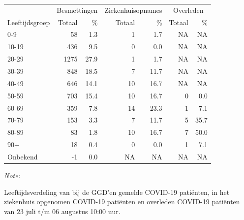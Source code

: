\documentclass[
  english,
  man,floatsintext]{apa6}
\begin{document}
\begin{table}[H]
\centering\begingroup\fontsize{11}{13}\selectfont

\begin{threeparttable}
\begin{tabular}{lrrrrrr}
\toprule
\multicolumn{1}{c}{ } & \multicolumn{2}{c}{Besmettingen} & \multicolumn{2}{c}{Ziekenhuisopnames} & \multicolumn{2}{c}{Overleden} \\
\cmidrule(l{3pt}r{3pt}){2-3} \cmidrule(l{3pt}r{3pt}){4-5} \cmidrule(l{3pt}r{3pt}){6-7}
Leeftijdsgroep & Totaal & \% & Totaal & \% & Totaal & \%\\
\midrule
0-9 & 58 & 1.3 & 1 & 1.7 & NA & NA\\
10-19 & 436 & 9.5 & 0 & 0.0 & NA & NA\\
20-29 & 1275 & 27.9 & 1 & 1.7 & NA & NA\\
30-39 & 848 & 18.5 & 7 & 11.7 & NA & NA\\
40-49 & 646 & 14.1 & 10 & 16.7 & NA & NA\\
50-59 & 703 & 15.4 & 10 & 16.7 & 0 & 0.0\\
60-69 & 359 & 7.8 & 14 & 23.3 & 1 & 7.1\\
70-79 & 153 & 3.3 & 7 & 11.7 & 5 & 35.7\\
80-89 & 83 & 1.8 & 10 & 16.7 & 7 & 50.0\\
90+ & 18 & 0.4 & 0 & 0.0 & 1 & 7.1\\
Onbekend & -1 & 0.0 & NA & NA & NA & NA\\
\bottomrule
\end{tabular}
\begin{tablenotes}
\item \textit{Note: } 
\item Leeftijdsverdeling van bij de GGD’en gemelde COVID-19 patiënten, in het ziekenhuis opgenomen COVID-19 patiënten en overleden COVID-19 patiënten van 23 juli t/m 06 augustus 10:00 uur.
\end{tablenotes}
\end{threeparttable}
\endgroup{}
\end{table}
\end{document}
